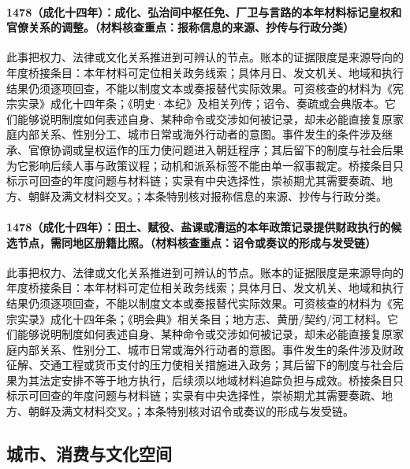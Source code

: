 \paragraph{1478（成化十四年）：成化、弘治间中枢任免、厂卫与言路的本年材料标记皇权和官僚关系的调整。（材料核查重点：报称信息的来源、抄传与行政分类）} 此事把权力、法律或文化关系推进到可辨认的节点。账本的证据限度是来源导向的年度桥接条目：本年材料可定位相关政务线索；具体月日、发文机关、地域和执行结果仍须逐项回查，不能以制度文本或奏报替代实际效果。可资核查的材料为《宪宗实录》成化十四年条；《明史·本纪》及相关列传；诏令、奏疏或会典版本。它们能够说明制度如何表述自身、某种命令或交涉如何被记录，却未必能直接复原家庭内部关系、性别分工、城市日常或海外行动者的意图。事件发生的条件涉及继承、官僚协调或皇权运作的压力使问题进入朝廷程序；其后留下的制度与社会后果为它影响后续人事与政策议程；动机和派系标签不能由单一叙事裁定。桥接条目只标示可回查的年度问题与材料链；实录有中央选择性，崇祯期尤其需要奏疏、地方、朝鲜及满文材料交叉。；本条特别核对报称信息的来源、抄传与行政分类。

\paragraph{1478（成化十四年）：田土、赋役、盐课或漕运的本年政策记录提供财政执行的候选节点，需同地区册籍比照。（材料核查重点：诏令或奏议的形成与发受链）} 此事把权力、法律或文化关系推进到可辨认的节点。账本的证据限度是来源导向的年度桥接条目：本年材料可定位相关政务线索；具体月日、发文机关、地域和执行结果仍须逐项回查，不能以制度文本或奏报替代实际效果。可资核查的材料为《宪宗实录》成化十四年条；《明会典》相关条目；地方志、黄册/契约/河工材料。它们能够说明制度如何表述自身、某种命令或交涉如何被记录，却未必能直接复原家庭内部关系、性别分工、城市日常或海外行动者的意图。事件发生的条件涉及财政征解、交通工程或货币支付的压力使相关措施进入政务；其后留下的制度与社会后果为其法定安排不等于地方执行，后续须以地域材料追踪负担与成效。桥接条目只标示可回查的年度问题与材料链；实录有中央选择性，崇祯期尤其需要奏疏、地方、朝鲜及满文材料交叉。；本条特别核对诏令或奏议的形成与发受链。

\subsection{城市、消费与文化空间}

